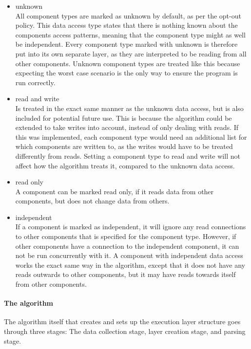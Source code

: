 \begin{itemize}
    \item unknown\\
    All component types are marked as unknown by default, as per the opt-out policy.
    This data access type states that there is nothing known about the components access patterns, meaning that the component type might as well be independent.
    Every component type marked with unknown is therefore put into its own separate layer, as they are interpreted to be reading from all other components.
    Unknown component types are treated like this because expecting the worst case scenario is the only way to ensure the program is run correctly.
    
    \item read and write\\
    Is treated in the exact same manner as the unknown data access, but is also included for potential future use.
    This is because the algorithm could be extended to take writes into account, instead of only dealing with reads.
    If this was implemented, each component type would need an additional list for which components are written to, as the writes would have to be treated differently from reads.
    Setting a component type to read and write will not affect how the algorithm treats it, compared to the unknown data access.

    \item read only\\
    A component can be marked read only, if it reads data from other components, but does not change data from others.

    \item independent\\
    If a component is marked as independent, it will ignore any read connections to other components that is specified for the component type.
    However, if other components have a connection to the independent component, it can not be run concurrently with it.
    A component with independent data access works the exact same way in the algorithm, except that it does not have any reads outwards to other components, but it may have reads towards itself from other components.
\end{itemize}

\paragraph{The algorithm}
The algorithm itself that creates and sets up the execution layer structure goes through three stages: The data collection stage, layer creation stage, and parsing stage.

